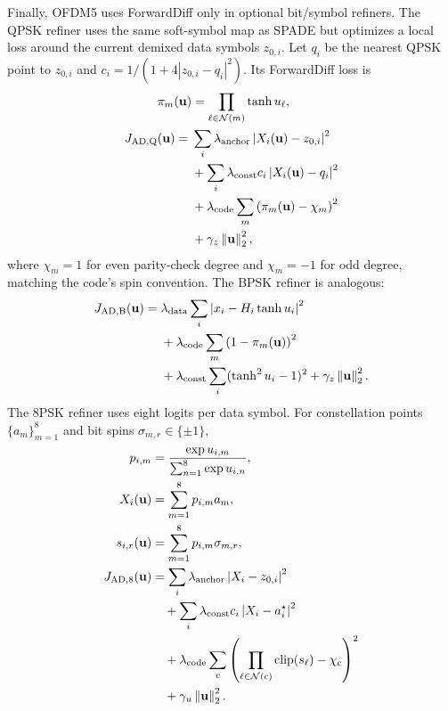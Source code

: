 \documentclass[journal]{IEEEtran}
\newcommand{\norm}[1]{\left\lVert #1 \right\rVert}
\newcommand{\abs}[1]{\left\lvert #1 \right\rvert}
\begin{document}
Finally, OFDM5 uses ForwardDiff only in optional bit/symbol refiners. The QPSK
refiner uses the same soft-symbol map as SPADE but optimizes a local loss around
the current demixed data symbols \(z_{0,i}\). Let \(q_i\) be the nearest QPSK
point to \(z_{0,i}\) and \(c_i=1/(1+4\abs{z_{0,i}-q_i}^2)\). Its ForwardDiff
loss is
\begin{equation}
\begin{aligned}
  \pi_m(\mathbf u)&=\prod_{\ell\in\mathcal N(m)}\tanh u_\ell,\\
  J_{\rm AD,Q}(\mathbf u)
  ={}&\sum_i\lambda_{\rm anchor}
      \abs{X_i(\mathbf u)-z_{0,i}}^2\\
  &+\sum_i\lambda_{\rm const}c_i
      \abs{X_i(\mathbf u)-q_i}^2\\
  &+\lambda_{\rm code}\sum_m
      \left(\pi_m(\mathbf u)-\chi_m\right)^2\\
  &+\gamma_z\norm{\mathbf u}_2^2 ,
\end{aligned}
  \label{eq:ofdm5-ad-qpsk-loss}
\end{equation}
where \(\chi_m=1\) for even parity-check degree and \(\chi_m=-1\) for odd
degree, matching the code's spin convention. The BPSK refiner is analogous:
\begin{equation}
\begin{aligned}
  J_{\rm AD,B}(\mathbf u)
  ={}&\lambda_{\rm data}\sum_i
      \abs{x_i-H_i\tanh u_i}^2\\
  &+\lambda_{\rm code}\sum_m
      \left(1-\pi_m(\mathbf u)\right)^2\\
  &+\lambda_{\rm const}\sum_i(\tanh^2 u_i-1)^2
   +\gamma_z\norm{\mathbf u}_2^2 .
\end{aligned}
  \label{eq:ofdm5-ad-bpsk-loss}
\end{equation}
The 8PSK refiner uses eight logits per data symbol. For constellation points
\(\{a_m\}_{m=1}^8\) and bit spins \(\sigma_{m,r}\in\{\pm1\}\),
\begin{equation}
\begin{aligned}
  p_{i,m}
    &=\frac{\exp u_{i,m}}{\sum_{n=1}^8\exp u_{i,n}},\\
  X_i(\mathbf u)&=\sum_{m=1}^8p_{i,m}a_m,\\
  s_{i,r}(\mathbf u)&=\sum_{m=1}^8p_{i,m}\sigma_{m,r},\\
  J_{\rm AD,8}(\mathbf u)
    &=\sum_i\lambda_{\rm anchor}\abs{X_i-z_{0,i}}^2\\
  &\quad+\sum_i\lambda_{\rm const}c_i\abs{X_i-a_i^\star}^2\\
  &\quad+\lambda_{\rm code}\sum_c
      \left(\prod_{\ell\in\mathcal N(c)}
      \operatorname{clip}(s_\ell)-\chi_c\right)^2\\
  &\quad+\gamma_u\norm{\mathbf u}_2^2 .
\end{aligned}
  \label{eq:ofdm5-ad-psk8-loss}
\end{equation}
\end{document}

